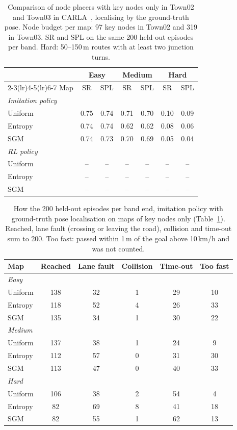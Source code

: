 \begin{table}[H]
\centering
\footnotesize
\setlength{\tabcolsep}{3.5pt}
\caption{Comparison of node placers with key nodes only in Town02 and Town03 in
CARLA~\cite{dosovitskiy2017carla}, localising by the ground-truth pose. Node budget
per map: 97 key nodes in Town02 and 319 in Town03. SR and SPL on the same 200
held-out episodes per band. Hard: 50--150\,m routes with at least two junction
turns.}
\label{tab:map_navigation_pose}
\begin{tabular}{lcccccc}
\toprule
 & \multicolumn{2}{c}{Easy} & \multicolumn{2}{c}{Medium} & \multicolumn{2}{c}{Hard} \\
\cmidrule(lr){2-3}\cmidrule(lr){4-5}\cmidrule(lr){6-7}
Map & SR & SPL & SR & SPL & SR & SPL \\
\midrule
\multicolumn{7}{l}{\textit{Imitation policy}} \\
Uniform & 0.75 & 0.74 & 0.71 & 0.70 & 0.10 & 0.09 \\
Entropy & 0.74 & 0.74 & 0.62 & 0.62 & 0.08 & 0.06 \\
SGM & 0.74 & 0.73 & 0.70 & 0.69 & 0.05 & 0.04 \\
\midrule
\multicolumn{7}{l}{\textit{RL policy}} \\
Uniform & -- & -- & -- & -- & -- & -- \\
Entropy & -- & -- & -- & -- & -- & -- \\
SGM & -- & -- & -- & -- & -- & -- \\
\bottomrule
\end{tabular}
\end{table}

\begin{table}[t]
\centering
\footnotesize
\setlength{\tabcolsep}{3.5pt}
\caption{How the 200 held-out episodes per band end, imitation policy with
ground-truth pose localisation on maps of key nodes only
(Table~\ref{tab:map_navigation_pose}). Reached, lane fault
(crossing or leaving the road), collision and time-out sum to 200. Too fast:
passed within 1\,m of the goal above 10\,km/h and was not counted.}
\label{tab:map_failures_pose}
\begin{tabular}{lccccc}
\toprule
Map & Reached & Lane fault & Collision & Time-out & Too fast \\
\midrule
\multicolumn{6}{l}{\textit{Easy}} \\
Uniform & 138 & 32 & 1 & 29 & 10 \\
Entropy & 118 & 52 & 4 & 26 & 33 \\
SGM & 135 & 34 & 1 & 30 & 22 \\
\midrule
\multicolumn{6}{l}{\textit{Medium}} \\
Uniform & 137 & 38 & 1 & 24 & 9 \\
Entropy & 112 & 57 & 0 & 31 & 30 \\
SGM & 113 & 47 & 0 & 40 & 33 \\
\midrule
\multicolumn{6}{l}{\textit{Hard}} \\
Uniform & 106 & 38 & 2 & 54 & 4 \\
Entropy & 82 & 69 & 8 & 41 & 18 \\
SGM & 82 & 55 & 1 & 62 & 13 \\
\bottomrule
\end{tabular}
\end{table}
